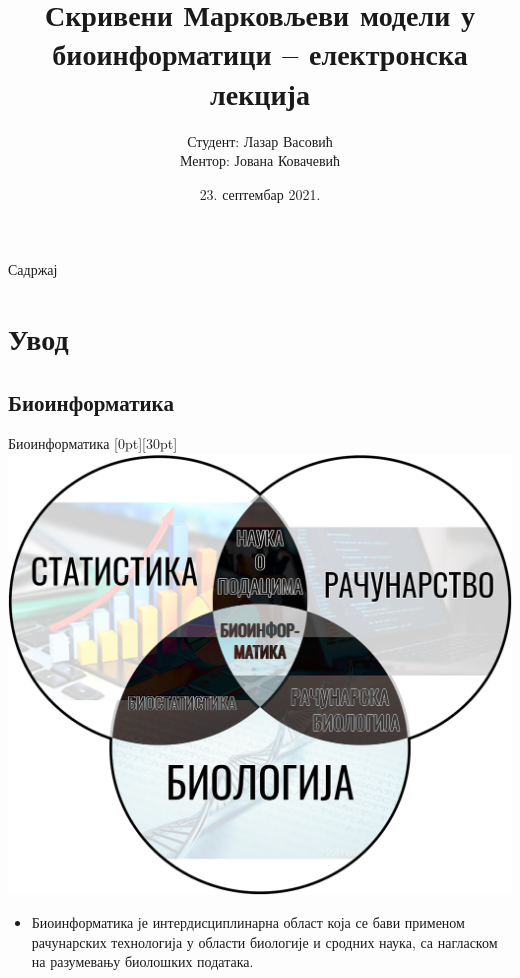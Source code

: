 \documentclass[hyperref={bookmarks=false}]{beamer}
\title[\textit{HMM} у биоинформатици]{Скривени Марковљеви модели у биоинформатици -- електронска лекција}
\author[Лазар Васовић]{Студент: Лазар Васовић\\ Ментор: Јована Ковачевић}
\date[Математички факултет]{23. септембар 2021.}
\newcommand{\lenitem}[2][.43\linewidth]{\parbox[t]{#1}{\strut #2\strut}}
\begin{document}
\frame{\titlepage}

\begin{frame}{Садржај}
\tableofcontents[subsectionstyle=hide]
\end{frame}

\section{Увод}
\subsection{Биоинформатика}
\begin{frame}{Биоинформатика}
\mbox{}\hfill\raisebox{-\height}[0pt][30pt]{\includegraphics[width=.5\linewidth]{bioinformatika.png}}
\vspace*{-\baselineskip}

\begin{itemize}
\item \lenitem{Биоинформатика је интердисциплинарна област која се бави применом рачунарских технологија у области биологије и сродних наука, са нагласком на разумевању биолошких података.}
\end{itemize}
\end{frame}
\end{document}
